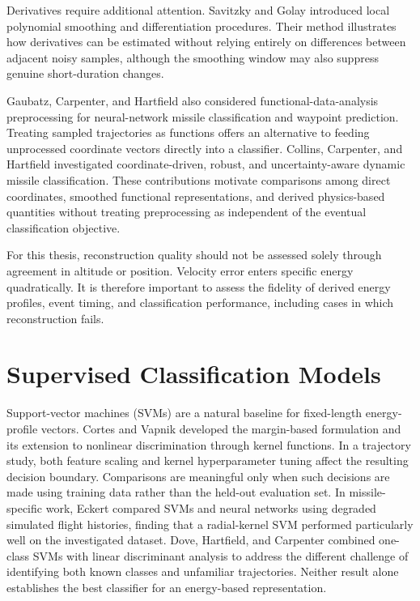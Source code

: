 Derivatives require additional attention. Savitzky and Golay
\cite{savitzky1964smoothing} introduced local polynomial
smoothing and differentiation procedures. Their method
illustrates how derivatives can be estimated without relying
entirely on differences between adjacent noisy samples,
although the smoothing window may also suppress genuine
short-duration changes.

Gaubatz, Carpenter, and Hartfield
\cite{gaubatz2025fda} also considered functional-data-analysis
preprocessing for neural-network missile classification and
waypoint prediction. Treating sampled trajectories as
functions offers an alternative to feeding unprocessed
coordinate vectors directly into a classifier. Collins,
Carpenter, and Hartfield \cite{collins2025crud}
investigated coordinate-driven, robust, and uncertainty-aware
dynamic missile classification. These contributions
motivate comparisons among direct coordinates,
smoothed functional representations, and derived
physics-based quantities without treating preprocessing
as independent of the eventual classification objective.

For this thesis, reconstruction quality should not be assessed
solely through agreement in altitude or position. Velocity
error enters specific energy quadratically. It is therefore
important to assess the fidelity of derived energy profiles,
event timing, and classification performance, including
cases in which reconstruction fails.

\section{Supervised Classification Models}
\label{sec:lit-classification}

Support-vector machines (SVMs) are a natural baseline for
fixed-length energy-profile vectors. Cortes and Vapnik
\cite{cortes1995svm} developed the margin-based formulation
and its extension to nonlinear discrimination through
kernel functions. In a trajectory study, both feature scaling
and kernel hyperparameter tuning affect the resulting
decision boundary. Comparisons are meaningful only when
such decisions are made using training data rather than
the held-out evaluation set. In missile-specific work,
Eckert \cite{eckert2020thesis} compared SVMs and
neural networks using degraded simulated flight histories,
finding that a radial-kernel SVM performed particularly
well on the investigated dataset. Dove, Hartfield,
and Carpenter \cite{dove2025novelty} combined
one-class SVMs with linear discriminant analysis to
address the different challenge of identifying both
known classes and unfamiliar trajectories. Neither
result alone establishes the best classifier for an
energy-based representation.


